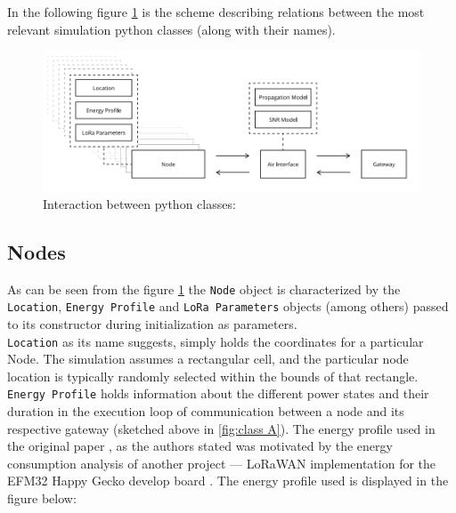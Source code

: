 In the following figure \ref{fig:architecture} is the scheme describing relations between the most relevant simulation python classes (along with their names).

\begin{figure}[h!]
  \centering
  \includegraphics[scale=0.5]{figures/architecture.PNG}
  \caption{Interaction between python classes: \cite{simulator}}
  \label{fig:architecture}
\end{figure}

\subsection{Nodes}

As can be seen from the figure \ref{fig:architecture} the \texttt{Node} object is characterized by the \texttt{Location}, \texttt{Energy Profile} and \texttt{LoRa Parameters} objects (among others) passed to its constructor during initialization as parameters.\\

\texttt{Location} as its name suggests, simply holds the coordinates for a particular Node. The simulation assumes a rectangular cell, and the particular node location is typically randomly selected within the bounds of that rectangle. \\

\texttt{Energy Profile} holds information about the different power states and their duration in the execution loop of communication between a node and its respective gateway (sketched above in \ref{fig:class A}). The energy profile used in the original paper \cite{simulator}, as the authors stated was motivated by the energy consumption analysis of another project — LoRaWAN implementation for the EFM32 Happy Gecko develop board \cite{energy_profile}. The energy profile used is displayed in the figure below:

